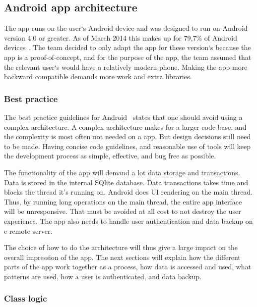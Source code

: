\subsection{Android app architecture}
The app runs on the user`s Android device and was designed to run on Android version 4.0 or greater. As of March 2014 this makes up for 79,7\% of Android devices~\cite{AndroidDeviceFragmentation}.
The team decided to only adapt the app for these version`s because the app is a proof-of-concept, and for the purpose of the app, the team assumed that the relevant user`s would have a relatively modern phone. Making the app more backward compatible demands more work and extra libraries. 

\subsubsection{Best practice}

The best practice guidelines for Android~\cite{androidPracticePerformance} states that one should avoid using a complex architecture. A complex architecture makes for a larger code base, and the complexity is most often not needed on a app. But design decisions still need to be made. Having concise code guidelines, and reasonable use of tools will keep the development process as simple, effective, and bug free as possible. 

The functionality of the app will demand a lot data storage and transactions. Data is stored in the internal SQlite database. Data transactions takes time and blocks the thread it's running on.
Android does UI rendering on the main thread. Thus, by running long operations on the main thread, the entire app interface will be unresponsive. That must be avoided at all cost to not destroy the user experience. The app also needs to handle user authentication and data backup on e remote server.

The choice of how to do the architecture will thus give a large impact on the overall impression of the app. The next sections will explain how the different parts of the app work together as a process, how data is accessed and used, what patterns are used, how a user is authenticated, and data backup.


\subsubsection{Class logic}


